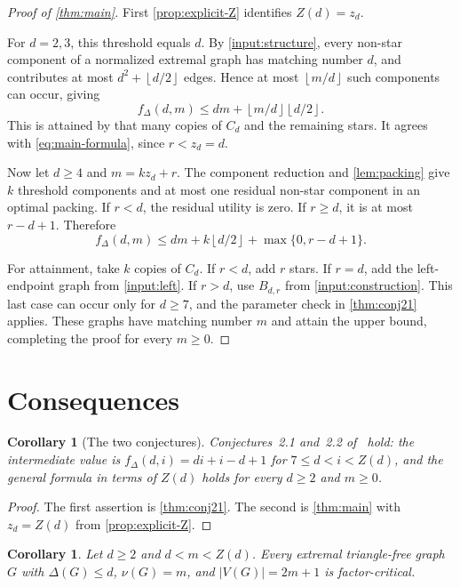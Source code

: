 \documentclass[11pt]{article}
\newtheorem{corollary}[theorem]{Corollary}
\theoremstyle{definition}
\theoremstyle{remark}
\newcommand{\fDelta}{f_{\Delta}}
\newcommand{\floor}[1]{\left\lfloor #1\right\rfloor}
\begin{document}
\begin{proof}[Proof of \cref{thm:main}]
First \cref{prop:explicit-Z} identifies $Z(d)=z_d$.

For $d=2,3$, this threshold equals $d$. By \cref{input:structure}, every
non-star component of a normalized extremal graph has matching number $d$,
and contributes at most $d^2+\floor{d/2}$ edges. Hence at most
$\floor{m/d}$ such components can occur, giving
\[
  \fDelta(d,m)\le dm+\floor{m/d}\floor{d/2}.
\]
This is attained by that many copies of $C_d$ and the remaining stars.
It agrees with \cref{eq:main-formula}, since $r<z_d=d$.

Now let $d\ge4$ and $m=kz_d+r$. The component reduction and
\cref{lem:packing} give $k$ threshold components and at most one residual
non-star component in an optimal packing. If $r<d$, the residual utility is
zero. If $r\ge d$, it is at most $r-d+1$. Therefore
\[
  \fDelta(d,m)\le dm+k\floor{d/2}+\max\{0,r-d+1\}.
\]

For attainment, take $k$ copies of $C_d$. If $r<d$, add $r$ stars.
If $r=d$, add the left-endpoint graph from \cref{input:left}.
If $r>d$, use $B_{d,r}$ from \cref{input:construction}. This last case
can occur only for $d\ge7$, and the parameter check in
\cref{thm:conj21} applies. These graphs have matching number $m$ and attain
the upper bound, completing the proof for every $m\ge0$.
\end{proof}

\section{Consequences}\label{sec:consequences}

\begin{corollary}[The two conjectures]\label{thm:conj22}
Conjectures~2.1 and~2.2 of~\cite{BET2023} hold: the intermediate value is
$\fDelta(d,i)=di+i-d+1$ for $7\le d<i<Z(d)$, and the general formula in
terms of $Z(d)$ holds for every $d\ge2$ and $m\ge0$.
\end{corollary}

\begin{proof}
The first assertion is \cref{thm:conj21}. The second is \cref{thm:main}
with $z_d=Z(d)$ from \cref{prop:explicit-Z}.
\end{proof}

\begin{corollary}\label{cor:factor-critical}
Let $d\ge2$ and $d<m<Z(d)$. Every extremal triangle-free graph $G$ with
$\Delta(G)\le d$, $\nu(G)=m$, and $|V(G)|=2m+1$ is factor-critical.
\end{corollary}
\end{document}
